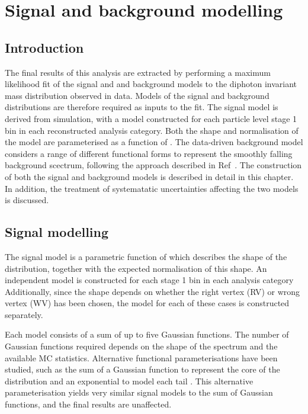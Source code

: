 \chapter{Signal and background modelling}
\label{chap:sigbkg}

\section{Introduction}

The final results of this analysis are extracted by performing a maximum likelihood fit 
of the signal and and background models to the diphoton invariant mass distribution observed in data.
Models of the signal and background \mgg distributions are therefore required as inputs to the fit.
The signal model is derived from simulation, 
with a model constructed for each particle level stage 1 bin in each reconstructed analysis category.
Both the shape and normalisation of the model are parameterised as a function of \mH.
The data-driven background model considers a range of different functional forms to 
represent the smoothly falling background scectrum, 
following the approach described in Ref~\cite{Envelope}.
The construction of both the signal and background models is described in detail in this chapter.
In addition, the treatment of systematatic uncertainties affecting the two models is discussed.

\section{Signal modelling}

The signal model is a parametric function of \mH which describes the shape of the \mgg distribution, 
together with the expected normalisation of this shape.
An independent model is constructed for each stage 1 bin in each analysis category
Additionally, since the \mgg shape depends on whether the right vertex (RV) 
or wrong vertex (WV) has been chosen, the model for each of these cases is constructed separately.

Each model consists of a sum of up to five Gaussian functions.
The number of Gaussian functions required depends on the shape of the \mgg spectrum 
and the available MC statistics.
Alternative functional parameterisations have been studied, 
such as the sum of a Gaussian function to represent the core of the \mgg distribution 
and an exponential to model each tail \cite{LouieThesis}.
This alternative parameterisation yields very similar signal models to the sum of Gaussian functions, 
and the final results are unaffected.

